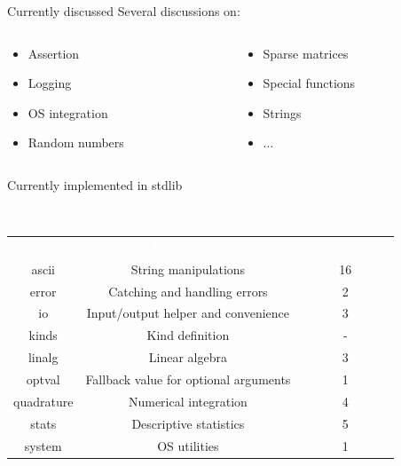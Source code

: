 \documentclass{beamer}
\begin{document}
\begin{frame}[c]{Currently discussed}
	Several discussions on:
	\begin{columns}
	\begin{column}{0.5\textwidth}
	\begin{itemize}
		\item Assertion
		\item Logging
		\item OS integration
		\item Random numbers
	\end{itemize}
	\end{column}
	\begin{column}{0.5\textwidth}
	\begin{itemize}
		\item Sparse matrices
		\item Special functions
		\item Strings
		\item ...
	\end{itemize}
	\end{column}
	\end{columns}
\end{frame}


\begin{frame}[c]{Currently implemented in stdlib}
	\begin{block}{~\vspace{0.5cm}}
	\vspace{-0.8cm}
	\begin{tabular}{ccc}
		\textcolor{white}{\bf Module} &\textcolor{white}{\bf Description} &\textcolor{white}{\bf \# procedures} \\
		ascii & String manipulations & 16\\
		error & Catching and handling errors & 2\\
		io & Input/output helper and convenience & 3\\
		kinds & Kind definition & -\\
		linalg & Linear algebra & 3\\
		optval & Fallback value for optional arguments & 1\\
		quadrature & Numerical integration & 4\\
		stats & Descriptive statistics & 5\\
		system & OS utilities & 1 \\
	\end{tabular}
	\end{block}
\end{frame}
\end{document}
